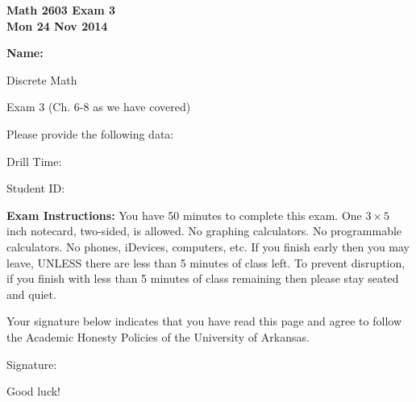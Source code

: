 \documentclass[12pt,letterpaper]{article}
\begin{document}
\flushleft
\begin{multicols}{2}

\begin{large}\textbf{Math 2603 Exam 3 \\
Mon 24 Nov 2014}\end{large}

\hfill\textbf{Name:  }\underline{\hspace{35ex}} %
\\
\vspace{.5in}

\end{multicols}

\pagestyle{empty}

\vspace{4pc}

\begin{center}\LARGE Discrete Math

Exam 3 (Ch. 6-8 as we have covered) \end{center}

\vspace{2pc}
Please provide the following data:

\vspace{2pc}
Drill Time: \underline{\hspace{40ex}}

\vspace{2pc}
Student ID: \underline{\hspace{40ex}}

\vspace{3pc}
{\bf Exam Instructions:} You have 50 minutes to complete this exam.  One $3\times 5$ inch notecard, two-sided, is allowed.  No graphing calculators.  No programmable calculators.  No phones, iDevices, computers, etc.  If you finish early then you may leave, UNLESS there are less than 5 minutes of class left.  To prevent disruption, if you finish with less than 5 minutes of class remaining then please stay seated and quiet.

\vspace{5pc}
Your signature below indicates that you have read this page and agree to follow the Academic Honesty Policies of the University of Arkansas.  

\vspace{3pc}
Signature: \underline{\hspace{79ex}}

\vfill
\begin{flushright}\Large Good luck!\end{flushright}
\end{document}
